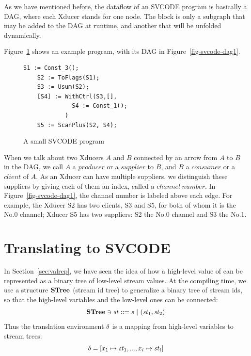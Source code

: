 	

As we have mentioned before, the dataflow of an SVCODE program is basically a DAG, where each Xducer stands for one node. 
The \wc block is only a subgraph that may be added to the DAG at runtime,  
and \sc another that will be unfolded dynamically.

Figure~\ref{fig-svcode-eg1} shows an example program, with its DAG in Figure~\ref{fig-svcode-dag1}. \\

\begin{figure}[H]
	\begin{lstlisting}[style=svcode-style]
	S1 := Const_3();
	S2 := ToFlags(S1);
	S3 := Usum(S2);
	[S4] := WithCtrl(S3,[], 
	          S4 := Const_1();
	        )
	S5 := ScanPlus(S2, S4);
	\end{lstlisting}	
	\caption{A small SVCODE program \label{fig-svcode-eg1}}
\end{figure}
\hspace{1cm}



When we talk about two Xducers $A$ and $B$ connected by an arrow from $A$ to $B$ in the DAG, we call $A$ a $producer$ or a $supplier$ to $B$, and $B$ a $consumer$ or a $client$ of $A$. 
As an Xducer can have multiple suppliers, we distinguish these suppliers by giving each of them an index, called a $channel \ number$. 
In Figure~\ref{fig-svcode-dag1}, the channel number is labeled above each edge. 
For example, the Xducer S2 has two clients, S3 and S5, for both of whom it is the No.0 channel;  Xducer S5 has two suppliers: S2 the No.0 channel and S3 the No.1. 






\section{Translating \mysnesl to SVCODE}
In Section~\ref{sec:valrep}, we have seen the idea of how a high-level value of \mysnesl can be represented as a binary tree of low-level stream values.
At the compiling time, we use a structure $\mathbf{STree}$ (stream id tree) to generalize a binary tree of stream ids, so that the high-level variables and the low-level ones can be connected: 
$$ \mathbf{STree} \ni \mathit{st} ::= \mathit{s} \ | \ (\mathit{st}_1,\mathit{st}_2) $$
Thus the translation environment $\delta$ is a mapping from high-level variables to stream trees:
 $$\del = [x_1 \|-> \st_1,..., x_i \|-> {\st_i}] $$ 

